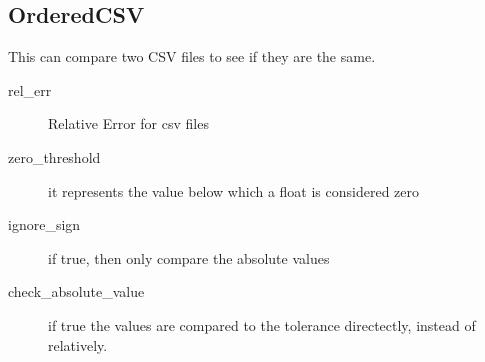 \documentclass{article}
\begin{document}
\subsection{OrderedCSV}

This can compare two CSV files to see if they are the same.

\begin{description}
  \item[rel\_err] Relative Error for csv files
  \item[zero\_threshold] it represents the value below which a float is considered zero
  \item[ignore\_sign] if true, then only compare the absolute values
  \item[check\_absolute\_value] if true the values are compared to the tolerance directectly, instead of relatively.
\end{description}
\end{document}
